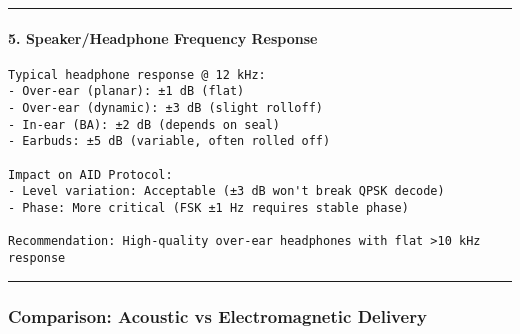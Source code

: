 \begin{center}\rule{0.5\linewidth}{0.5pt}\end{center}

\paragraph{5. Speaker/Headphone Frequency
Response}\label{speakerheadphone-frequency-response}

\begin{verbatim}
Typical headphone response @ 12 kHz:
- Over-ear (planar): ±1 dB (flat)
- Over-ear (dynamic): ±3 dB (slight rolloff)
- In-ear (BA): ±2 dB (depends on seal)
- Earbuds: ±5 dB (variable, often rolled off)

Impact on AID Protocol:
- Level variation: Acceptable (±3 dB won't break QPSK decode)
- Phase: More critical (FSK ±1 Hz requires stable phase)

Recommendation: High-quality over-ear headphones with flat >10 kHz response
\end{verbatim}

\begin{center}\rule{0.5\linewidth}{0.5pt}\end{center}

\subsubsection{Comparison: Acoustic vs Electromagnetic
Delivery}\label{comparison-acoustic-vs-electromagnetic-delivery}

